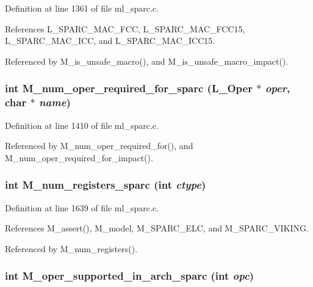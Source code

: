 Definition at line 1361 of file ml\_\-sparc.c.

References L\_\-SPARC\_\-MAC\_\-FCC, L\_\-SPARC\_\-MAC\_\-FCC15, L\_\-SPARC\_\-MAC\_\-ICC, and L\_\-SPARC\_\-MAC\_\-ICC15.

Referenced by M\_\-is\_\-unsafe\_\-macro(), and M\_\-is\_\-unsafe\_\-macro\_\-impact().
\subsubsection{\setlength{\rightskip}{0pt plus 5cm}int M\_\-num\_\-oper\_\-required\_\-for\_\-sparc (L\_\-Oper $\ast$ {\em oper}, char $\ast$ {\em name})}\label{m__sparc_8h_40f5e6281463d1d5d65447e60560d81a}




Definition at line 1410 of file ml\_\-sparc.c.

Referenced by M\_\-num\_\-oper\_\-required\_\-for(), and M\_\-num\_\-oper\_\-required\_\-for\_\-impact().
\subsubsection{\setlength{\rightskip}{0pt plus 5cm}int M\_\-num\_\-registers\_\-sparc (int {\em ctype})}\label{m__sparc_8h_3ef9226a6ce2047330f0e5e3b2ce2665}




Definition at line 1639 of file ml\_\-sparc.c.

References M\_\-assert(), M\_\-model, M\_\-SPARC\_\-ELC, and M\_\-SPARC\_\-VIKING.

Referenced by M\_\-num\_\-registers().
\subsubsection{\setlength{\rightskip}{0pt plus 5cm}int M\_\-oper\_\-supported\_\-in\_\-arch\_\-sparc (int {\em opc})}\label{m__sparc_8h_336abacefae249cfb08f2ba5cfbdcb19}




